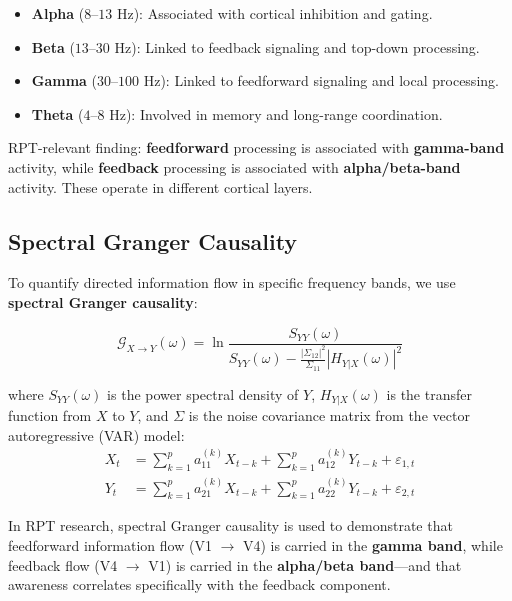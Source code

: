 \documentclass[11pt,a4paper]{report}
\begin{document}
\begin{definitionbox}
\begin{itemize}[leftmargin=1.5em]
  \item \textbf{Alpha} ($8$--$13$ Hz): Associated with cortical inhibition and gating.
  \item \textbf{Beta} ($13$--$30$ Hz): Linked to feedback signaling and top-down processing.
  \item \textbf{Gamma} ($30$--$100$ Hz): Linked to feedforward signaling and local processing.
  \item \textbf{Theta} ($4$--$8$ Hz): Involved in memory and long-range coordination.
\end{itemize}
RPT-relevant finding: \textbf{feedforward} processing is associated with \textbf{gamma-band} activity, while \textbf{feedback} processing is associated with \textbf{alpha/beta-band} activity. These operate in different cortical layers.
\end{definitionbox}

\subsection{Spectral Granger Causality}

To quantify directed information flow in specific frequency bands, we use \textbf{spectral Granger causality}:

\begin{mathbox}
\vspace{-8pt}
\[
  \mathcal{G}_{X \to Y}(\omega) = \ln \frac{S_{YY}(\omega)}{S_{YY}(\omega) - \frac{|\Sigma_{12}|^2}{\Sigma_{11}} |H_{Y|X}(\omega)|^2}
\]
\vspace{-10pt}
\end{mathbox}

where $S_{YY}(\omega)$ is the power spectral density of $Y$, $H_{Y|X}(\omega)$ is the transfer function from $X$ to $Y$, and $\Sigma$ is the noise covariance matrix from the vector autoregressive (VAR) model:
\begin{align}
  X_t &= \sum_{k=1}^{p} a_{11}^{(k)} X_{t-k} + \sum_{k=1}^{p} a_{12}^{(k)} Y_{t-k} + \varepsilon_{1,t} \\
  Y_t &= \sum_{k=1}^{p} a_{21}^{(k)} X_{t-k} + \sum_{k=1}^{p} a_{22}^{(k)} Y_{t-k} + \varepsilon_{2,t}
\end{align}

In RPT research, spectral Granger causality is used to demonstrate that feedforward information flow (V1 $\to$ V4) is carried in the \textbf{gamma band}, while feedback flow (V4 $\to$ V1) is carried in the \textbf{alpha/beta band}---and that awareness correlates specifically with the feedback component.
\end{document}

